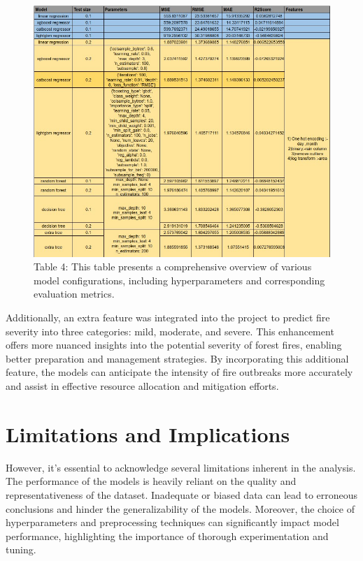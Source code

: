 \begin{figure}[ht]
    \centering
    \includegraphics[scale=0.8]{figures/Comprehensive overview of various model configurations.jpg}
    \caption{Table 4: This table presents a comprehensive overview of various model configurations, including hyperparameters and corresponding evaluation metrics.}
    \label{fig:example-02}
\end{figure}

Additionally, an extra feature was integrated into the project to predict fire severity into three categories: mild, moderate, and severe. This enhancement offers more nuanced insights into the potential severity of forest fires, enabling better preparation and management strategies. By incorporating this additional feature, the models can anticipate the intensity of fire outbreaks more accurately and assist in effective resource allocation and mitigation efforts.

\section{Limitations and Implications}

However, it's essential to acknowledge several limitations inherent in the analysis. The performance of the models is heavily reliant on the quality and representativeness of the dataset. Inadequate or biased data can lead to erroneous conclusions and hinder the generalizability of the models. Moreover, the choice of hyperparameters and preprocessing techniques can significantly impact model performance, highlighting the importance of thorough experimentation and tuning.

